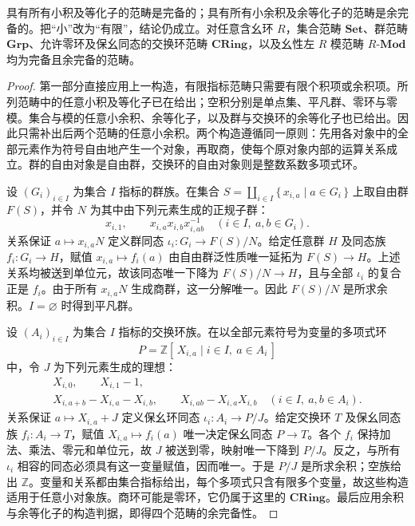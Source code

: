 \begin{corollary}[完备性的构造判据]\label{b4:cor:completeness-criterion}
	具有所有小积及等化子的范畴是完备的；具有所有小余积及余等化子的范畴是余完备的。把“小”改为“有限”，结论仍成立。对任意含幺环 \(R\)，集合范畴 \(\mathbf{Set}\)、群范畴 \(\mathbf{Grp}\)、允许零环及保幺同态的交换环范畴 \(\mathbf{CRing}\)，以及幺性左 \(R\) 模范畴 \(R\text{-}\mathbf{Mod}\) 均为完备且余完备的范畴。
\end{corollary}
\begin{proof}
	第一部分直接应用上一构造，有限指标范畴只需要有限个积项或余积项。所列范畴中的任意小积及等化子已在给出；空积分别是单点集、平凡群、零环与零模。集合与模的任意小余积、余等化子，以及群与交换环的余等化子也已给出。因此只需补出后两个范畴的任意小余积。两个构造遵循同一原则：先用各对象中的全部元素作为符号自由地产生一个对象，再取商，使每个原对象内部的运算关系成立。群的自由对象是自由群，交换环的自由对象则是整数系数多项式环。

	设 \((G_i)_{i\in I}\) 为集合 \(I\) 指标的群族。在集合 \(S=\coprod_{i\in I}\{\,x_{i,a}\mid a\in G_i\,\}\) 上取自由群 \(F(S)\)，并令 \(N\) 为其中由下列元素生成的正规子群：
	\[
		x_{i,1},\qquad x_{i,a}x_{i,b}x_{i,ab}^{-1} \quad(i\in I,\ a,b\in G_i).
	\]
	关系保证 \(a\mapsto x_{i,a}N\) 定义群同态 \(\iota_i:G_i\rightarrow F(S)/N\)。给定任意群 \(H\) 及同态族 \(f_i:G_i\rightarrow H\)，赋值 \(x_{i,a}\mapsto f_i(a)\) 由自由群泛性质唯一延拓为 \(F(S)\rightarrow H\)。上述关系均被送到单位元，故该同态唯一下降为 \(F(S)/N\rightarrow H\)，且与全部 \(\iota_i\) 的复合正是 \(f_i\)。由于所有 \(x_{i,a}N\) 生成商群，这一分解唯一。因此 \(F(S)/N\) 是所求余积。\(I=\varnothing\) 时得到平凡群。

	设 \((A_i)_{i\in I}\) 为集合 \(I\) 指标的交换环族。在以全部元素符号为变量的多项式环
	\[
		P=\mathbb Z[\,X_{i,a}\mid i\in I,\ a\in A_i\,]
	\]
	中，令 \(J\) 为下列元素生成的理想：
	\[
		\begin{gathered}
			X_{i,0},\qquad X_{i,1}-1,\\
			X_{i,a+b}-X_{i,a}-X_{i,b},\qquad X_{i,ab}-X_{i,a}X_{i,b} \quad(i\in I,\ a,b\in A_i).
		\end{gathered}
	\]
	关系保证 \(a\mapsto X_{i,a}+J\) 定义保幺环同态 \(\iota_i:A_i\rightarrow P/J\)。给定交换环 \(T\) 及保幺同态族 \(f_i:A_i\rightarrow T\)，赋值 \(X_{i,a}\mapsto f_i(a)\) 唯一决定保幺同态 \(P\rightarrow T\)。各个 \(f_i\) 保持加法、乘法、零元和单位元，故 \(J\) 被送到零，映射唯一下降到 \(P/J\)。反之，与所有 \(\iota_i\) 相容的同态必须具有这一变量赋值，因而唯一。于是 \(P/J\) 是所求余积；空族给出 \(\mathbb Z\)。变量和关系都由集合指标给出，每个多项式只含有限多个变量，故这些构造适用于任意小对象族。商环可能是零环，它仍属于这里的 \(\mathbf{CRing}\)。最后应用余积与余等化子的构造判据，即得四个范畴的余完备性。
\end{proof}

